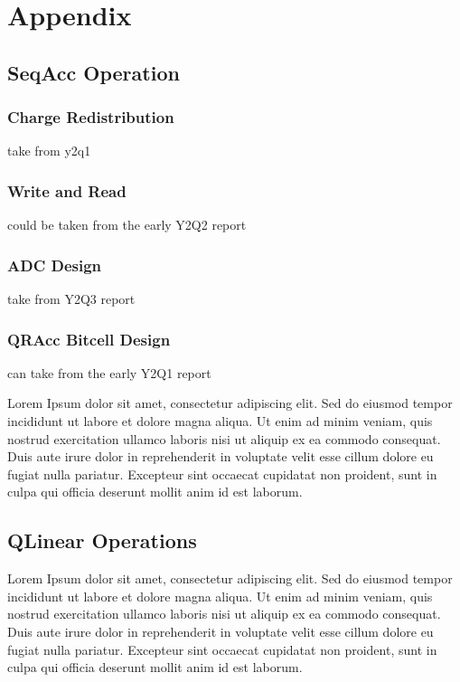 \chapter*{Appendix}

\section{SeqAcc Operation}
\label{section:appendixseqacc}

\subsection{Charge Redistribution}

take from y2q1 

\subsection{Write and Read}

could be taken from the early Y2Q2 report

\subsection{ADC Design}

take from Y2Q3 report

\subsection{QRAcc Bitcell Design}

can take from the early Y2Q1 report

Lorem Ipsum dolor sit amet, consectetur adipiscing elit. Sed do eiusmod tempor incididunt ut labore et dolore magna aliqua. Ut enim ad minim veniam, quis nostrud exercitation ullamco laboris nisi ut aliquip ex ea commodo consequat. Duis aute irure dolor in reprehenderit in voluptate velit esse cillum dolore eu fugiat nulla pariatur. Excepteur sint occaecat cupidatat non proident, sunt in culpa qui officia deserunt mollit anim id est laborum.

\section{QLinear Operations}
\label{section:appendixqlinearops}
Lorem Ipsum dolor sit amet, consectetur adipiscing elit. Sed do eiusmod tempor incididunt ut labore et dolore magna aliqua. Ut enim ad minim veniam, quis nostrud exercitation ullamco laboris nisi ut aliquip ex ea commodo consequat. Duis aute irure dolor in reprehenderit in voluptate velit esse cillum dolore eu fugiat nulla pariatur. Excepteur sint occaecat cupidatat non proident, sunt in culpa qui officia deserunt mollit anim id est laborum.

